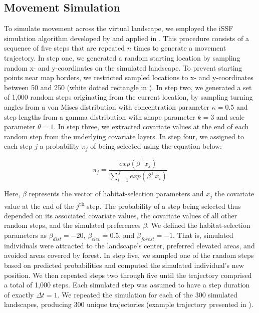 \documentclass[../FinalThesis.tex]{subfiles}
\begin{document}
\subsection{Movement Simulation}
\label{MovementSimulation}
To simulate movement across the virtual landscape, we employed the iSSF
simulation algorithm developed by \citet{Signer.2017} and applied in
\citet{Hofmann.2023}. This procedure consists of a sequence of five steps that
are repeated $n$ times to generate a movement trajectory. In step one, we
generated a random starting location by sampling random x- and y-coordinates on
the simulated landscape. To prevent starting points near map borders, we
restricted sampled locations to x- and y-coordinates between 50 and 250 (white
dotted rectangle in ). In step two, we generated a set of 1,000
random steps originating from the current location, by sampling turning angles
from a von Mises distribution with concentration parameter $\kappa = 0.5$ and
step lengths from a gamma distribution with shape parameter $k = 3$ and scale
parameter $\theta = 1$. In step three, we extracted covariate values at the end
of each random step from the underlying covariate layers. In step four, we
assigned to each step $j$ a probability $\pi_j$ of being selected using the
equation below:

\begin{equation}
\label{EQ4}
  \pi_j =
  \frac{exp(\beta^\top x_j)}{\sum_{i = 1}^J exp(\beta^\top x_i)} %
\end{equation}

\noindent Here, $\beta$ represents the vector of habitat-selection parameters
and $x_j$ the covariate value at the end of the $j$\textsuperscript{th} step.
The probability of a step being selected thus depended on its associated
covariate values, the covariate values of all other random steps, and the
simulated preferences $\beta$. We defined the habitat-selection parameters as
$\beta_{dist} = -20$, $\beta_{elev} = 0.5$, and $\beta_{forest} = -1$. That is,
simulated individuals were attracted to the landscape's center, preferred
elevated areas, and avoided areas covered by forest. In step five, we sampled
one of the random steps based on predicted probabilities and computed the
simulated individual's new position. We then repeated steps two through five
until the trajectory comprised a total of 1,000 steps. Each simulated step was
assumed to have a step duration of exactly $\Delta t = 1$. We repeated the
simulation for each of the 300 simulated landscapes, producing 300 unique
trajectories (example trajectory presented in ).
\end{document}
